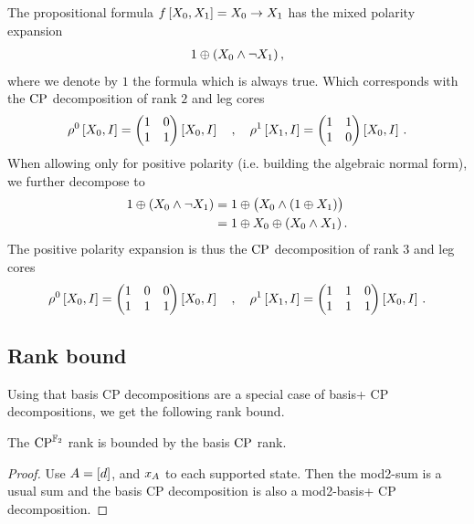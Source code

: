 \begin{example}
    The propositional formula $f\left[X_{0},X_{1}\right]=X_{0}\rightarrow X_{1}$ has the mixed polarity expansion
    \begin{align*}
        1 \oplus (X_{0}\land\lnot X_{1}) \, ,
    \end{align*}
    where we denote by $1$ the formula which is always true.
    Which corresponds with the $\mathrm{CP}$ decomposition of rank $2$ and leg cores
    \begin{align*}
        \rho^{0}\left[X_{0},I\right]
        = \begin{pmatrix} 1 & 0 \\ 1 & 1 \end{pmatrix}\left[X_{0},I\right]
        \quad, \quad
        \rho^{1}\left[X_{1},I\right]
        = \begin{pmatrix} 1 & 1 \\ 1 & 0 \end{pmatrix}\left[X_{0},I\right] \, .
    \end{align*}
    When allowing only for positive polarity (i.e. building the algebraic normal form), we further decompose to
    \begin{align*}
        1 \oplus (X_{0}\land\lnot X_{1})
        &= 1 \oplus \big(X_{0} \land (1 \oplus X_{1})\big) \\
        &= 1 \oplus X_{0} \oplus (X_{0}\land X_{1}) \, .
    \end{align*}
    The positive polarity expansion is thus the $\mathrm{CP}$ decomposition of rank $3$ and leg cores
    \begin{align*}
        \rho^{0}\left[X_{0},I\right]
        = \begin{pmatrix} 1 & 0 & 0\\ 1 & 1 & 1 \end{pmatrix}\left[X_{0},I\right]
        \quad, \quad
        \rho^{1}\left[X_{1},I\right]
        = \begin{pmatrix} 1 & 1 & 0\\ 1 & 1 & 1 \end{pmatrix}\left[X_{0},I\right] \, .
    \end{align*}
\end{example}

\subsection{Rank bound}

Using that basis CP decompositions are a special case of basis+ CP decompositions, we get the following rank bound.

\begin{lemma}
    The $\mathrm{CP}^{\mathbb{F}_2}$ rank is bounded by the basis $\mathrm{CP}$ rank.
\end{lemma}
\begin{proof}
    Use $A=[d]$, and $x_{A}$ to each supported state.
    Then the mod2-sum is a usual sum and the basis CP decomposition is also a mod2-basis+ CP decomposition.
\end{proof}
